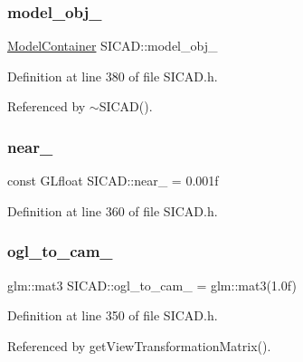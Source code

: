 \subsubsection{\texorpdfstring{model\+\_\+obj\+\_\+}{model\_obj\_}}
{\footnotesize\ttfamily \mbox{\hyperlink{classSICAD_aca3c9693d298f2e8dc171194c6a7507c}{Model\+Container}} S\+I\+C\+A\+D\+::model\+\_\+obj\+\_\+\hspace{0.3cm}{\ttfamily [private]}}



Definition at line 380 of file S\+I\+C\+A\+D.\+h.



Referenced by $\sim$\+S\+I\+C\+A\+D().

\mbox{\label{classSICAD_a690437655965101bad97d32e98015dd5}} 
\subsubsection{\texorpdfstring{near\+\_\+}{near\_}}
{\footnotesize\ttfamily const G\+Lfloat S\+I\+C\+A\+D\+::near\+\_\+ = 0.\+001f\hspace{0.3cm}{\ttfamily [private]}}



Definition at line 360 of file S\+I\+C\+A\+D.\+h.

\mbox{\label{classSICAD_a95af2758122e6420369516fd13fd03cc}} 
\subsubsection{\texorpdfstring{ogl\+\_\+to\+\_\+cam\+\_\+}{ogl\_to\_cam\_}}
{\footnotesize\ttfamily glm\+::mat3 S\+I\+C\+A\+D\+::ogl\+\_\+to\+\_\+cam\+\_\+ = glm\+::mat3(1.\+0f)\hspace{0.3cm}{\ttfamily [private]}}



Definition at line 350 of file S\+I\+C\+A\+D.\+h.



Referenced by get\+View\+Transformation\+Matrix().

\mbox{\label{classSICAD_a56b765675245d3b4501cfda799d4630a}} 
